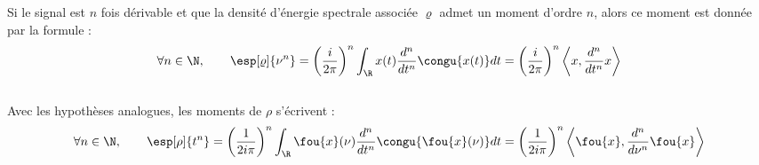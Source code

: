 \begin{proposition} \label{prop:integ_trick}
	Si le signal est $n$ fois dérivable et que la densité d’énergie spectrale associée $\varrho$ admet un moment d'ordre $n$, alors ce moment est donnée par la formule :
	\begin{equation}\label{eq:moment_f}
		\forall n\in\N,\qquad \esp[\varrho]{\nu^n} = \left(\frac{i}{2 \pi}\right)^n  \int_\R x(t) \frac{d^n}{dt^n} \congu{x(t)} dt = \left(\frac{i}{2 \pi}\right)^n  \left\langle x, \frac{d^n}{dt^n}x\right\rangle
	\end{equation}
	\\
	Avec les hypothèses analogues, les moments de $\rho$ s'écrivent :
	\begin{equation}\label{eq:moment_t}
		\forall n\in\N,\qquad \esp[\rho]{t^n} = \left(\frac{1}{2i \pi}\right)^n  \int_\R \fou{x}(\nu) \frac{d^n}{dt^n} \congu{\fou{x}(\nu)} dt = \left(\frac{1}{2i \pi}\right)^n  \left\langle \fou{x}, \frac{d^n}{d\nu^n}\fou{x}\right\rangle
	\end{equation}
\end{proposition}


